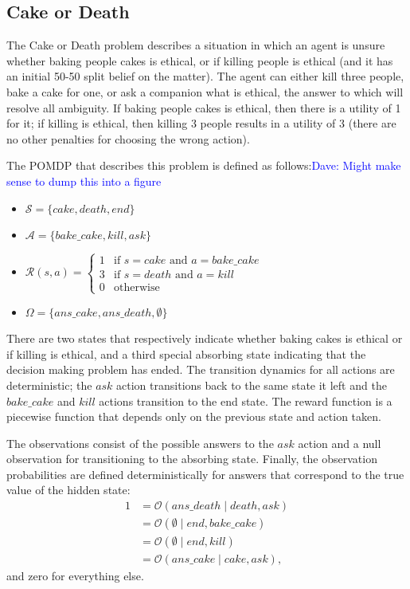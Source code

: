 \documentclass[11pt]{article}
\newcommand\davenote[1]{\textcolor{blue}{Dave: #1}}
\begin{document}
\subsection{Cake or Death}
The Cake or Death problem describes a situation in which an agent is unsure whether baking people cakes is ethical, or if killing people is ethical (and it has an initial 50-50 split belief on the matter). The agent can either kill three people, bake a cake for one, or ask a companion what is ethical, the answer to which will resolve all ambiguity. If baking people cakes is ethical, then there is a utility of 1 for it; if killing is ethical, then killing 3 people results in a utility of 3 (there are no other penalties for choosing the wrong action).

The POMDP that describes this problem is defined as follows:\davenote{Might make sense to dump this into a figure}
\begin{itemize}
\item[] $\mathcal{S} = \{ cake, death, end \}$
\item[] $\mathcal{A} = \{bake\_cake, kill, ask \}$
\item[] $\mathcal{R}(s, a) =
 \begin{cases} 
1 & \mbox{if } s = cake \mbox{ and } a = bake\_cake \\
3 & \mbox{if } s = death \mbox{ and } a = kill \\
0 & \mbox{otherwise}
\end{cases}$
\item[] $\Omega = \{ans\_cake, ans\_death, \emptyset \}$
\end{itemize}

\noindent There are two states that respectively indicate whether baking cakes is ethical or if killing is ethical, and a third special absorbing state indicating that the decision making problem has ended. The transition dynamics for all actions are deterministic; the $ask$ action transitions back to the same state it left and the $bake\_cake$ and $kill$ actions transition to the end state. The reward function is a piecewise function that depends only on the previous state and action taken.

The observations consist of the possible answers to the $ask$ action and a null observation for transitioning to the absorbing state. Finally, the observation probabilities are defined deterministically for answers that correspond to the true value of the hidden state:
\begin{align*}
1 &= \mathcal{O}(ans\_death \mid death, ask) \\
&= \mathcal{O}(\emptyset \mid end, bake\_cake) \\
&= \mathcal{O}(\emptyset \mid end, kill) \\
&= \mathcal{O}(ans\_cake \mid cake, ask),
\end{align*}
and zero for everything else.
\end{document}
